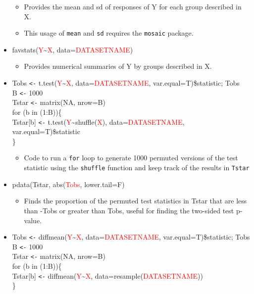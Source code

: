 \documentclass[]{book}
\providecommand{\tightlist}{%
  \setlength{\itemsep}{0pt}\setlength{\parskip}{0pt}}
\begin{document}
\begin{itemize}
  \begin{itemize}
  \item
    Provides the mean and sd of responses of Y for each group described
    in X.
  \item
    This usage of \texttt{mean} and \texttt{sd} requires the
    \texttt{mosaic} package.
  \end{itemize}
\item
  favstats(\textcolor{red}{Y}\textasciitilde{}\textcolor{red}{X},
  data=\textcolor{red}{DATASETNAME})

  \begin{itemize}
  \tightlist
  \item
    Provides numerical summaries of Y by groups described in X.
  \end{itemize}
\item
  Tobs \texttt{\textless{}-}
  t.test(\textcolor{red}{Y}\textasciitilde{}\textcolor{red}{X},
  data=\textcolor{red}{DATASETNAME}, var.equal=T)\$statistic; Tobs\\
  B \texttt{\textless{}-} 1000\\
  Tstar \texttt{\textless{}-} matrix(NA, nrow=B)\\
  for (b in (1:B))\{\\
  Tstar{[}b{]} \texttt{\textless{}-}
  t.test(\textcolor{red}{Y}\textasciitilde{}shuffle(\textcolor{red}{X}),
  data=\textcolor{red}{DATASETNAME}, var.equal=T)\$statistic\\
  \}

  \begin{itemize}
  \tightlist
  \item
    Code to run a \texttt{for} loop to generate 1000 permuted versions
    of the test statistic using the \texttt{shuffle} function and keep
    track of the results in \texttt{Tstar}
  \end{itemize}
\item
  pdata(Tstar, abs(\textcolor{red}{Tobs}, lower.tail=F)

  \begin{itemize}
  \tightlist
  \item
    Finds the proportion of the permuted test statistics in Tstar that
    are less than -\textbar{}Tobs\textbar{} or greater than
    \textbar{}Tobs\textbar{}, useful for finding the two-sided test
    p-value.
  \end{itemize}
\item
  Tobs \texttt{\textless{}-}
  diffmean(\textcolor{red}{Y}\textasciitilde{}\textcolor{red}{X},
  data=\textcolor{red}{DATASETNAME}, var.equal=T)\$statistic; Tobs\\
  B \texttt{\textless{}-} 1000\\
  Tstar \texttt{\textless{}-} matrix(NA, nrow=B)\\
  for (b in (1:B))\{\\
  Tstar{[}b{]} \texttt{\textless{}-}
  diffmean(\textcolor{red}{Y}\textasciitilde{}\textcolor{red}{X},
  data=resample(\textcolor{red}{DATASETNAME}))\\
  \}


\end{itemize}
\end{document}
